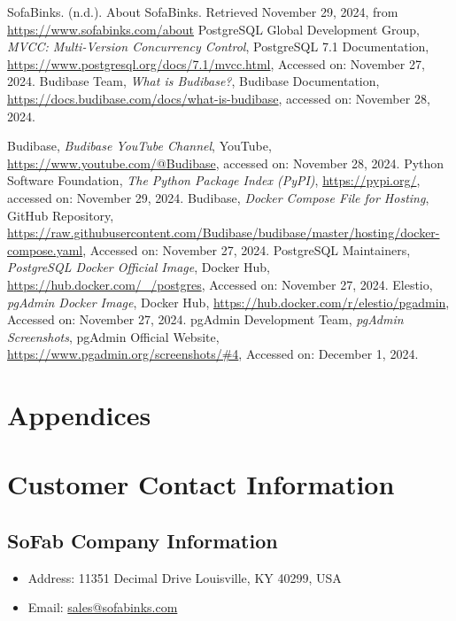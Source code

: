 \documentclass{article}
\begin{document}
\clearpage
\begin{thebibliography}{99}
 SofaBinks. (n.d.). 
    About SofaBinks. Retrieved November 29, 2024, from \url{https://www.sofabinks.com/about}
 PostgreSQL Global Development Group, \textit{MVCC: Multi-Version Concurrency Control}, 
    PostgreSQL 7.1 Documentation, \url{https://www.postgresql.org/docs/7.1/mvcc.html}, Accessed on: November 27, 2024.
Budibase Team, 
\textit{What is Budibase?}, Budibase Documentation, 
\url{https://docs.budibase.com/docs/what-is-budibase}, 
accessed on: November 28, 2024.

Budibase, 
\textit{Budibase YouTube Channel}, YouTube, 
\url{https://www.youtube.com/@Budibase}, 
accessed on: November 28, 2024.
Python Software Foundation, 
\textit{The Python Package Index (PyPI)}, 
\url{https://pypi.org/}, 
accessed on: November 29, 2024.
 Budibase, \textit{Docker Compose File for Hosting}, 
GitHub Repository, \url{https://raw.githubusercontent.com/Budibase/budibase/master/hosting/docker-compose.yaml}, 
Accessed on: November 27, 2024.
 PostgreSQL Maintainers, 
\textit{PostgreSQL Docker Official Image}, Docker Hub, 
\url{https://hub.docker.com/_/postgres}, 
Accessed on: November 27, 2024.
 Elestio, 
\textit{pgAdmin Docker Image}, Docker Hub, 
\url{https://hub.docker.com/r/elestio/pgadmin}, 
Accessed on: November 27, 2024.
 pgAdmin Development Team, 
\textit{pgAdmin Screenshots}, pgAdmin Official Website, 
\url{https://www.pgadmin.org/screenshots/#4}, 
Accessed on: December 1, 2024.
\end{thebibliography}



\newpage
\section*{Appendices} %
\appendix
\section{Customer Contact Information}
\subsection{SoFab Company Information}
\begin{itemize}
    \item Address: 11351 Decimal Drive Louisville, KY 40299, USA
    \item Email: \url{sales@sofabinks.com}
\end{itemize}
\end{document}
